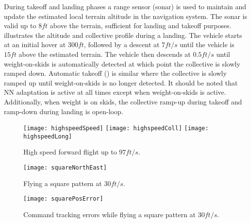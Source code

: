 During takeoff and landing phases a range sensor (sonar) is used to
maintain and update the estimated local terrain altitude in the
navigation system. The sonar is valid up to $8 ft$ above the
terrain, sufficient for landing and takeoff purposes.
 illustrates the altitude and collective profile
during a landing. The vehicle starts at an initial hover at $300
ft$, followed by a descent at $7 ft/s$ until the vehicle is $15 ft$
above the estimated terrain. The vehicle then descends at $0.5 ft/s$
until weight-on-skids is automatically detected at which point the
collective is slowly ramped down. Automatic takeoff
() is similar where the collective is slowly ramped
up until weight-on-skids is no longer detected. It should be noted
that NN adaptation is active at all times except when
weight-on-skids is active. Additionally, when weight is on skids,
the collective ramp-up during takeoff and ramp-down during landing
is open-loop.


\begin{figure}
  \begin{center}
  \texttt{[image: highspeedSpeed]}
  \texttt{[image: highspeedColl]}
  \texttt{[image: highspeedLong]}
  \caption{High speed forward flight up to $97 ft/s$.}
  \label{f:highspeed}
  \end{center}
\end{figure}
\begin{figure}
  \begin{center}
  \texttt{[image: squareNorthEast]}
  \caption{Flying a square pattern at $30 ft/s$.}
  \label{f:squareNorthEast}
  \end{center}
\end{figure}
\begin{figure}
  \begin{center}
  \texttt{[image: squarePosError]}
  \caption{Command tracking errors while flying a square pattern at $30 ft/s$.}
  \label{f:squarePosError}
  \end{center}
\end{figure}


